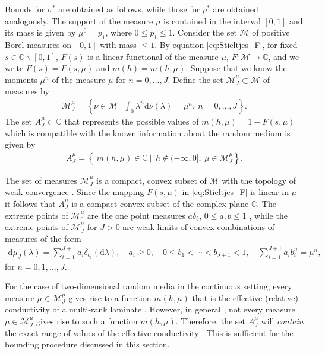 \documentclass{cmslatex}
\renewcommand{\d}{\text{d}}
\begin{document}
Bounds for $\sigma^*$ are obtained as follows, while those for $\rho^*$ are
obtained analogously. The support of the measure 
$\mu$ is contained in the interval $[0,1]$ and its mass is given by
$\mu^0=p_1$, where $0\leq p_1\leq1$. Consider the set $\mathscr{M}$ of
positive Borel measures on $[0,1]$ with mass $\leq1$. By equation
\eqref{eq:Stieltjes_F}, for fixed $s\in\mathbb{C}\backslash[0,1]$, $F(s)$ is a
linear functional of the measure $\mu$, $F:\mathscr{M}\mapsto\mathbb{C}$, and
we write $F(s)=F(s,\mu)$ and $m(h)=m(h,\mu)$. Suppose that we know the
moments $\mu^n$ of the measure $\mu$ for $n=0,\ldots,J$. Define the set
$\mathscr{M}_J^\mu\subset\mathscr{M}$ of measures by
% 
\begin{align}\label{eq:Measure_Set}
  \mathscr{M}_J^\mu
     =\left\{\nu\in\mathscr{M} \ \Big| \   \int_0^1\lambda^n\d\nu(\lambda)=\mu^n, \  n=0,\ldots,J\right\}  . 
\end{align}
%
The set $A_J^\mu\subset\mathbb{C}$ that represents the possible
values of $m(h,\mu)=1-F(s,\mu)$ which is compatible with the
known information about the random medium is given by
%
\begin{align}\label{eq:Bounding_Set}
  A_J^\mu
     =\left\{\ m(h,\mu)\in\mathbb{C} \ | \
       \ h\not\in(-\infty,0], \ \mu\in \mathscr{M}_J^\mu\right\}. 
\end{align}
%



The set of measures $\mathscr{M}_J^\mu$ is a compact, convex
subset of $\mathscr{M}$ with the topology of weak convergence
\cite{Golden:CMP-473}. Since the mapping $F(s,\mu)$ in
\eqref{eq:Stieltjes_F} is linear in $\mu$ it follows that
$A_J^\mu$ is a compact convex subset of the complex plane
$\mathbb{C}$. The extreme points of $\mathscr{M}_0^\mu$ are the one 
point measures $a\delta_b$, $0\leq a,b\leq1$ \cite{Dunford_Schwartz:LinOp_PtI},
while the extreme points of $\mathscr{M}_J^\mu$ for $J>0$ are weak limits
of convex combinations of measures of the form
\cite{Karlin_Studden:Book:1966,Golden:CMP-473}  
%
\begin{align}\label{eq:Discrete_Measure}
  \d\mu_J(\lambda)=\sum_{i=1}^{J+1}a_i\delta_{b_i}(\d\lambda), \quad
  a_i\geq0, \quad 0\leq b_1<\cdots<b_{J+1}<1, \quad
  \sum_{i=1}^{J+1}a_ib_i^n=\mu^n,
\end{align}
%
for $n=0,1,\ldots,J$.


For the case of two-dimensional random media in the
continuous setting, every measure $\mu\in\mathscr{M}_J^\mu$ gives rise
to a function $m(h,\mu)$ that is the effective (relative) conductivity
of a multi-rank laminate \cite{MILTON:2002:TC}.
However, in general \cite{Golden:CMP-473},  not every measure
$\mu\in\mathscr{M}_J^\mu$ gives rise to such a function $m(h,\mu)$. Therefore,
the set $A_J^\mu$ will \emph{contain} the exact range of values of the
effective conductivity \cite{Golden:CMP-473}. This is sufficient for
the bounding procedure discussed in this section. 
\end{document}
